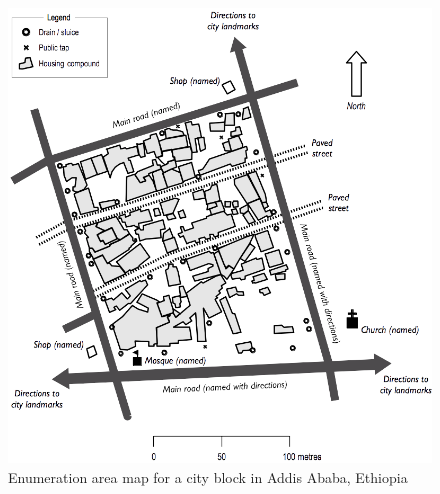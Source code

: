 \documentclass[12pt,a4paper]{book}
\theoremstyle{definition}
\theoremstyle{definition}
\theoremstyle{definition}
\theoremstyle{remark}
\begin{document}
\begin{figure}[H]

{\centering \includegraphics[width=800pt]{figures/stage2sample12} 

}

\caption{Enumeration area map for a city block in Addis Ababa, Ethiopia}\label{fig:sample26}
\end{figure}
\end{document}
